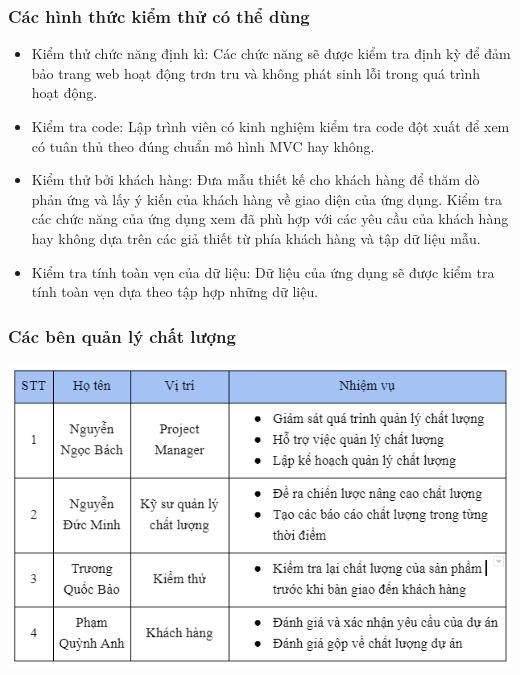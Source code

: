 \documentclass[12pt]{article}
\begin{document}
\subsubsection{Các hình thức kiểm thử có thể dùng}
\begin{itemize}[label=-, leftmargin=1cm]
    \item Kiểm thử chức năng định kì: Các chức năng sẽ được kiểm tra định kỳ để đảm bảo trang web hoạt động trơn tru và không phát sinh lỗi trong quá trình hoạt động. 
    \item Kiểm tra code: Lập trình viên có kinh nghiệm kiểm tra code đột xuất để xem có tuân thủ theo đúng chuẩn mô hình MVC hay không.
    \item Kiểm thử bởi khách hàng: Đưa mẫu thiết kế cho khách hàng để thăm dò phản ứng và lấy ý kiến của khách hàng về giao diện của ứng dụng. Kiểm tra các chức năng của ứng dụng xem đã phù hợp với các yêu cầu của khách hàng hay không dựa trên các giả thiết từ phía khách hàng và tập dữ liệu mẫu.
    \item Kiểm tra tính toàn vẹn của dữ liệu: Dữ liệu của ứng dụng sẽ được kiểm tra tính toàn vẹn dựa theo tập hợp những dữ liệu.
\end{itemize}

\subsubsection{Các bên quản lý chất lượng}
\includegraphics[width=15cm]{II_5_3.png}
\vspace{0.5cm}
\end{document}
